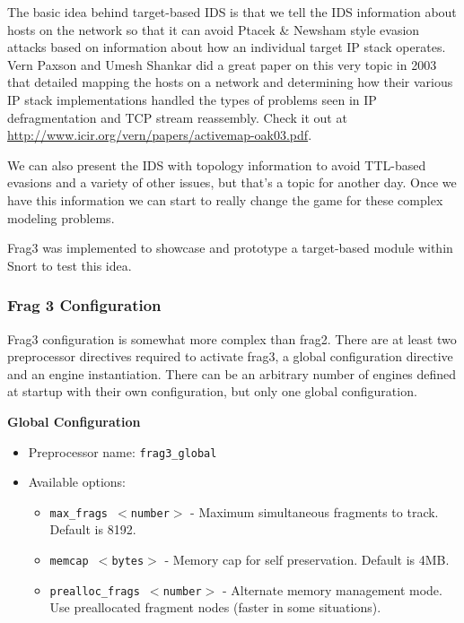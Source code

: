 \documentclass[english]{report}
\begin{document}
The basic idea behind target-based IDS is that we tell the IDS information 
about hosts on the network so that it can avoid Ptacek \& Newsham style evasion
attacks based on information about how an individual target IP stack operates.
Vern Paxson and Umesh Shankar did a great paper on this very topic in 2003 that 
detailed mapping the hosts on a network and determining how their various IP 
stack implementations handled the types of problems seen in IP defragmentation 
and TCP stream reassembly.  Check it out at \url{http://www.icir.org/vern/papers/activemap-oak03.pdf}.

We can also present the IDS with topology information to avoid TTL-based 
evasions and a variety of other issues, but that's a topic for another day.  
Once we have this information we can start to really change the game for these 
complex modeling problems.

Frag3 was implemented to showcase and prototype a target-based module within
Snort to test this idea.

\subsubsection{Frag 3 Configuration}

Frag3 configuration is somewhat more complex than frag2.  There are at least
two preprocessor directives required to activate frag3, a global configuration
directive and an engine instantiation.  There can be an arbitrary number of
engines defined at startup with their own configuration, but only one global
configuration.

\textbf{Global Configuration}
\begin{itemize}
\item Preprocessor name: \texttt{frag3\_global}
\item Available options:
  \begin{itemize}
   \item     \texttt{max\_frags $<$number$>$} - Maximum simultaneous fragments to track. Default is 8192.
   \item     \texttt{memcap $<$bytes$>$} - Memory cap for self preservation.  Default is 4MB.  
   \item    \texttt{prealloc\_frags $<$number$>$} - Alternate memory management mode.  Use preallocated fragment nodes (faster in some situations).
  \end{itemize}                               
\end{itemize}    
 
\end{document}
